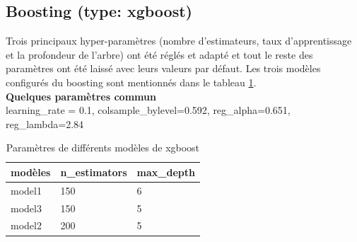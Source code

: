 \subsection{Boosting (type: xgboost)}
Trois principaux hyper-paramètres (nombre d'estimateurs, taux d'apprentissage et la profondeur de l'arbre) ont été réglés et adapté et tout le reste des paramètres ont été laissé avec leurs valeurs par défaut. Les trois modèles configurés du boosting sont mentionnés dans le tableau \ref{param_boost}.\\
\textbf{Quelques paramètres commun}\\
learning\_rate = 0.1, colsample\_bylevel=0.592, reg\_alpha=0.651, reg\_lambda=2.84
\begin{table}[H]
    \centering
    \begin{tabular}{|l|l|l|}
         \hline 
         modèles&n\_estimators&max\_depth\\
         \hline
          model1 &150&6\\
         \hline
         model3&150&5\\
         \hline         
         model2 &200&5\\
         \hline
    \end{tabular}
    \caption{Paramètres de différents modèles de xgboost}
    \label{param_boost}
\end{table}



